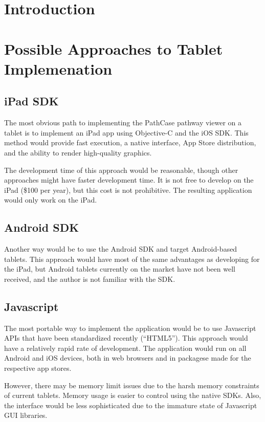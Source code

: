 \section{Introduction}

\section{Possible Approaches to Tablet Implemenation}

\subsection{iPad SDK}

The most obvious path to implementing the PathCase pathway viewer on a tablet is to implement an iPad app using Objective-C and the iOS SDK. This method would provide fast execution, a native interface, App Store distribution, and the ability to render high-quality graphics.

The development time of this approach would be reasonable, though other approaches might have faster development time. It is not free to develop on the iPad (\$100 per year), but this cost is not prohibitive. The resulting application would only work on the iPad.

\subsection{Android SDK}

Another way would be to use the Android SDK and target Android-based tablets. This approach would have most of the same advantages as developing for the iPad, but Android tablets currently on the market have not been well received, and the author is not familiar with the SDK.

\subsection{Javascript}

The most portable way to implement the application would be to use Javascript APIs that have been standardized recently (``HTML5''). This approach would have a relatively rapid rate of development. The application would run on all Android and iOS devices, both in web browsers and in packagese made for the respective app stores.

However, there may be memory limit issues due to the harsh memory constraints of current tablets. Memory usage is easier to control using the native SDKs. Also, the interface would be less sophisticated due to the immature state of Javascript GUI libraries.
